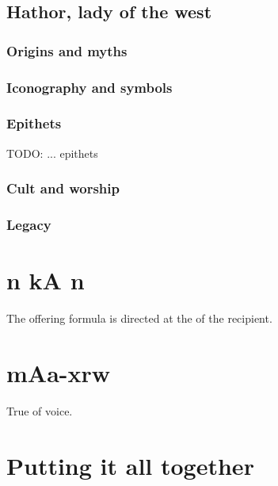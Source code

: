 \subsection*{Hathor, lady of the west}

\subsubsection*{Origins and myths}

\subsubsection*{Iconography and symbols}

\subsubsection*{Epithets}

TODO: ... epithets

\subsubsection*{Cult and worship}

\subsubsection*{Legacy}

\section*{n kA n}

The offering formula is directed at the  of the recipient.

\section*{mAa-xrw}

True of voice.

\section*{Putting it all together}